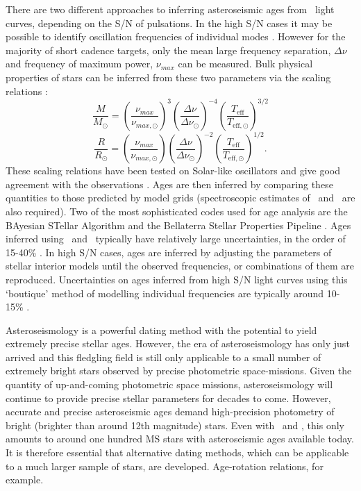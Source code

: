There are two different approaches to inferring asteroseismic ages from
\kepler\ light curves, depending on the S/N of pulsations.
In the high S/N cases it may be possible to identify oscillation frequencies
of individual modes \citep[\eg][]{Metcalfe2010,
Silva-aguirre2012, Lebreton2014}.
However for the majority of short cadence targets, only the
mean large frequency separation, $\Delta\nu$ and frequency of maximum power,
$\nu_{max}$ can be measured.
Bulk physical properties of stars can be inferred from these two parameters
via the scaling relations \citep{Brown1991, Kjeldsen1995}:
\begin{equation}
    \frac{M}{M_\odot} = \left(\frac{\nu_{max}}{\nu_{max,\odot}}\right)^3
    \left(\frac{\Delta\nu}{\Delta\nu_\odot}\right)^{-4}
    \left(\frac{T_{\mathrm{eff}}}{T_{\mathrm{eff},\odot}}\right)^{3/2}
\end{equation}
\begin{equation}
    \frac{R}{R_\odot} = \left(\frac{\nu_{max}}{\nu_{max,\odot}}\right)
    \left(\frac{\Delta\nu}{\Delta\nu_\odot}\right)^{-2}
    \left(\frac{T_{\mathrm{eff}}}{T_{\mathrm{eff},\odot}}\right)^{1/2}.
\end{equation}
These scaling relations have been tested on Solar-like oscillators and give
good agreement with the observations \citep[\eg][]{Chaplin2013, Coelho2015}.
Ages are then inferred by comparing these quantities to those predicted by
model grids (spectroscopic estimates of \teff\ and \feh\ are also required).
Two of the most sophisticated codes used for age analysis are the BAyesian
STellar Algorithm \citep[BASTA][]{Silva-aguirre2015} and the Bellaterra
Stellar Properties Pipeline \citep{Serenelli2013}.
Ages inferred using \dnu\ and \numax\ typically have relatively large
uncertainties, in the order of 15-40\% \citep{Silva-aguirre2015a}.
In high S/N cases, ages are inferred by adjusting the parameters of stellar
interior models \citep[\eg][]{Kjeldsen2008} until the observed frequencies, or
combinations of them are reproduced.
Uncertainties on ages inferred from high S/N light curves using this
`boutique' method of modelling individual frequencies are typically around
10-15\% \citep{Silva-aguirre2015a}.

Asteroseismology is a powerful dating method with the potential to yield
extremely precise stellar ages.
However, the era of asteroseismology has only just arrived and this fledgling
field is still only applicable to a small number of extremely bright stars
observed by precise photometric space-missions.
Given the quantity of up-and-coming photometric space missions,
asteroseismology will continue to provide precise stellar parameters for
decades to come.
However, accurate and precise asteroseismic ages demand high-precision
photometry of bright (brighter than around 12th magnitude) stars.
Even with \kepler\ and \corot, this only amounts to around one hundred MS
stars with asteroseismic ages available today.
It is therefore essential that alternative dating methods, which can be
applicable to a much larger sample of stars, are developed.
Age-rotation relations, for example.

